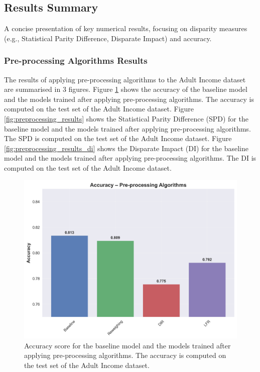 \documentclass[12pt,a4paper,openright,twoside]{book}
\begin{document}
\subsection{Results Summary}
A concise presentation of key numerical results, focusing on disparity measures (e.g., Statistical Parity Difference, Disparate Impact) and accuracy.
\subsubsection{Pre-processing Algorithms Results}
The results of applying pre-processing algorithms to the Adult Income dataset are summarised in 3 figures. Figure \ref{fig:baseline_results} shows the accuracy of the baseline model and the models trained after applying pre-processing algorithms. The accuracy is computed on the test set of the Adult Income dataset.
Figure \ref{fig:preprocessing_results} shows the Statistical Parity Difference (SPD) for the baseline model and the models trained after applying pre-processing algorithms. The SPD is computed on the test set of the Adult Income dataset. Figure \ref{fig:preprocessing_results_di} shows the Disparate Impact (DI) for the baseline model and the models trained after applying pre-processing algorithms. The DI is computed on the test set of the Adult Income dataset.

\begin{figure}
    \centering
    \includegraphics[width=\textwidth]{figures/preprocessing_results/preprocessing_accuracy_comparison.png}
    \caption{Accuracy score for the baseline model and the models trained after applying pre-processing algorithms. The accuracy is computed on the test set of the Adult Income dataset.}
    \label{fig:baseline_results}
\end{figure}
\end{document}

